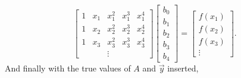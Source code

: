 \begin{equation} \label{LinAlgSubscript}
\begin{bmatrix}
1 & x_1 & x_1^2 & x_1^3 & x_1^4 \\
1 & x_2 & x_2^2 & x_2^3 & x_2^4 \\
1 & x_3 & x_3^2 & x_3^3 & x_3^4 \\
 & & \vdots & &
\end{bmatrix}
\begin{bmatrix}
b_0 \\
b_1 \\
b_2 \\
b_3 \\
b_4 
\end{bmatrix}
=
\begin{bmatrix}
f(x_1) \\ 
f(x_2) \\
f(x_3) \\ 
\vdots
\end{bmatrix}.
\end{equation}
And finally with the true values of $A$ and $\vec{y}$ inserted,

